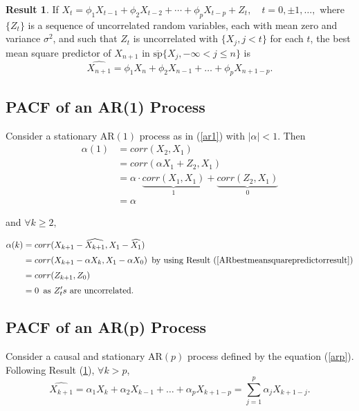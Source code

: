 \documentclass[11pt, a4paper]{article}
\numberwithin{equation}{section}
\theoremstyle{definition}
\newtheorem{result}{Result}[section]
\begin{document}
\begin{result}\label{ARbestmeansquarepredictorresult}
If $X_t = \phi_1 X_{t-1} + \phi_2 X_{t-2} + \cdots + \phi_p X_{t-p} + Z_t, \quad t = 0, \pm 1, \ldots,$ where $\{Z_t\}$ is a sequence of uncorrelated random variables, each with mean zero and variance $\sigma^2$, and such that $Z_t$ is uncorrelated with $\{X_j, j < t\}$ for each $t$, the best mean square predictor of $X_{n+1}$ in $\overline{\mathrm{sp}}\{X_j, -\infty < j \le n\}$ is
$$\widehat{X_{n+1}} = \phi_1 X_n + \phi_2 X_{n-1} + \ldots + \phi_p X_{n+1-p}.$$
\end{result}

\subsection{PACF of an AR(1) Process} \label{AR1_PACF}

Consider a stationary AR$(1)$ process as in (\ref{ar1}) with $|\alpha| < 1$. 
Then
\begin{align*}
\alpha(1) &= corr(X_2, X_1) \\[0.25em]
&= corr(\alpha X_1 + Z_2, X_1) \\[0.25em]
&= \alpha \cdot \underbrace{corr(X_1, X_1)}_{1} + \underbrace{corr(Z_2, X_1)}_{0} \\[0.25em]
&= \alpha
\end{align*}

and $\forall k \geq 2,$

\begin{align*}
\alpha(k) &= corr(X_{k+1} - \widehat{X_{k+1}}, X_1 - \widehat{X_1}) \\[0.25em]
&= corr(X_{k+1} - \alpha X_{k}, X_1 - \alpha X_0) \, \text{ by using Result }(\ref{ARbestmeansquarepredictorresult}) \\[0.25em]
&= corr(Z_{k+1}, Z_0) \\[0.25em]
&= 0 \, \text{ as } Z_t's \text{ are uncorrelated.}
\end{align*}

\subsection{PACF of an AR(p) Process}\label{PACFofARp}

Consider a causal and stationary AR$(p)$ process defined by the equation (\ref{arp}). Following Result (\ref{ARbestmeansquarepredictorresult}), $\forall k > p$, 
$$\displaystyle{\widehat{X_{k+1}} = \alpha_1 X_{k} + \alpha_2 X_{k-1} + \ldots + \alpha_p X_{k+1-p} = \sum \limits_{j = 1}^{p} \alpha_j X_{k+1-j}}.$$
\end{document}
